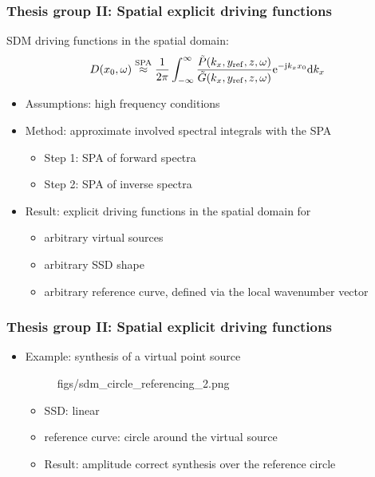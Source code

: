\documentclass{beamer}
\begin{document}
\begin{frame}
\frametitle{Thesis group II: Spatial explicit driving functions}
%
SDM driving functions in the spatial domain:
\begin{equation*}
D(x_0,\omega) \stackrel{\text{SPA}}{\approx}  \frac{1}{2\pi} \int_{-\infty}^{\infty} \frac{\tilde{P}(k_x,y_{\mathrm{ref}},z, \omega) }{\tilde{G}(k_x,y_{\mathrm{ref}},z, \omega)} \mathrm{e}^{-\mathrm{j} k_x x_0} \mathrm{d} k_x
\end{equation*}
\begin{itemize}
\item Assumptions: high frequency conditions
\item Method: approximate involved spectral integrals with the SPA
	\begin{itemize}
	\item Step 1: SPA of forward spectra
	\item Step 2: SPA of inverse spectra
	\end{itemize}
\item Result: explicit driving functions in the spatial domain for
	\begin{itemize}
	\item arbitrary virtual sources
	\item arbitrary SSD shape
	\item arbitrary reference curve, defined via the local wavenumber vector
	\end{itemize}
\end{itemize}
\end{frame} 

\begin{frame}
\frametitle{Thesis group II: Spatial explicit driving functions}
\begin{itemize}
\item Example: synthesis of a virtual point source
\begin{figure}
	\begin{overpic}[width = 0.95\columnwidth ]{figs/sdm_circle_referencing_2.png}
	\end{overpic}
\end{figure}
	\begin{itemize}
	\item SSD: linear
	\item reference curve: circle around the virtual source
	\item Result: amplitude correct synthesis over the reference circle
	\end{itemize}
\end{itemize}
\end{frame}
% 
\end{document}
